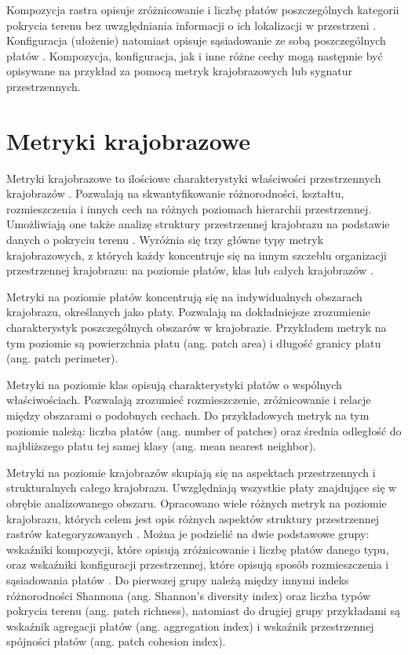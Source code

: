 \documentclass{amuthesis}
\begin{document}
Kompozycja rastra opisuje zróżnicowanie i liczbę płatów poszczególnych
kategorii pokrycia terenu bez uwzględniania informacji o ich lokalizacji
w przestrzeni \autocite{Gustafson1998,solon2002,kozak2014}. Konfiguracja
(ułożenie) natomiast opisuje sąsiadowanie ze sobą poszczególnych płatów
\autocite{Gustafson1998,solon2002,kozak2014}. Kompozycja, konfiguracja,
jak i inne różne cechy mogą następnie być opisywane na przykład za
pomocą metryk krajobrazowych lub sygnatur przestrzennych.

\hypertarget{metryki-krajobrazowe}{%
\section{Metryki krajobrazowe}\label{metryki-krajobrazowe}}

Metryki krajobrazowe to ilościowe charakterystyki właściwości
przestrzennych krajobrazów \autocite{McGarigal_fragstats}. Pozwalają na
skwantyfikowanie różnorodności, kształtu, rozmieszczenia i innych cech
na różnych poziomach hierarchii przestrzennej. Umożliwiają one także
analizę struktury przestrzennej krajobrazu na podstawie danych o
pokryciu terenu \autocite{Pukowiec_Kurda_Sobala_2016}. Wyróżnia się trzy
główne typy metryk krajobrazowych, z których każdy koncentruje się na
innym szczeblu organizacji przestrzennej krajobrazu: na poziomie płatów,
klas lub całych krajobrazów \autocite{McGarigal_fragstats}.

Metryki na poziomie płatów koncentrują się na indywidualnych obszarach
krajobrazu, określanych jako płaty. Pozwalają na dokładniejsze
zrozumienie charakterystyk poszczególnych obszarów w krajobrazie.
Przykładem metryk na tym poziomie są powierzchnia płatu (ang. patch
area) i długość granicy płatu (ang. patch perimeter).

Metryki na poziomie klas opisują charakterystyki płatów o wspólnych
właściwościach. Pozwalają zrozumieć rozmieszczenie, zróżnicowanie i
relacje między obszarami o podobnych cechach. Do przykładowych metryk na
tym poziomie należą: liczba płatów (ang. number of patches) oraz średnia
odległość do najbliższego płatu tej samej klasy (ang. mean nearest
neighbor).

Metryki na poziomie krajobrazów skupiają się na aspektach przestrzennych
i strukturalnych całego krajobrazu. Uwzględniają wszystkie płaty
znajdujące się w obrębie analizowanego obszaru. Opracowano wiele różnych
metryk na poziomie krajobrazu, których celem jest opis różnych aspektów
struktury przestrzennej rastrów kategoryzowanych
\autocite{McGarigal_fragstats}. Można je podzielić na dwie podstawowe
grupy: wskaźniki kompozycji, które opisują zróżnicowanie i liczbę płatów
danego typu, oraz wskaźniki konfiguracji przestrzennej, które opisują
sposób rozmieszczenia i sąsiadowania płatów
\autocite{solon2002,kozak2014}. Do pierwszej grupy należą między innymi
indeks różnorodności Shannona (ang. Shannon's diversity index) oraz
liczba typów pokrycia terenu (ang. patch richness), natomiast do drugiej
grupy przykładami są wskaźnik agregacji płatów (ang. aggregation index)
i wskaźnik przestrzennej spójności płatów (ang. patch cohesion index).
\end{document}
